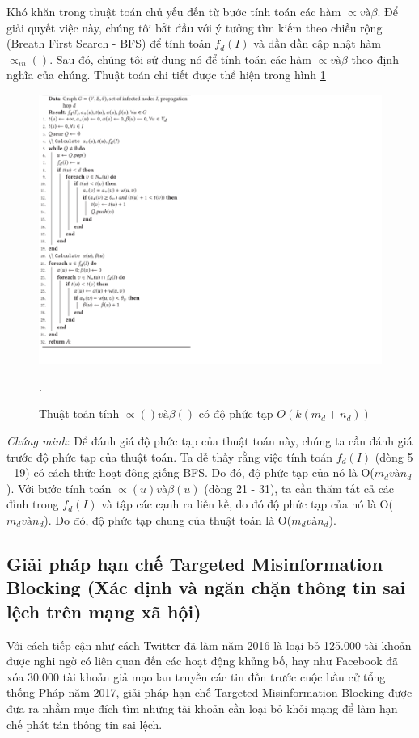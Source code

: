 		Khó khăn trong thuật toán chủ yếu đến từ bước tính toán các hàm $\propto và \beta$. Để giải quyết việc này, chúng tôi bắt đầu với ý tưởng tìm kiếm theo chiều rộng (Breath First Search - BFS) để tính toán $f_{d}(I)$ và dần dần cập nhật hàm $\propto_{in}()$. Sau đó, chúng tôi sử dụng nó để tính toán các hàm  $\propto và \beta$ theo định nghĩa của chúng. Thuật toán chi tiết được thể hiện trong hình \ref{refthuattoan2}
		\begin{center}
			\begin{figure}[htp]
				\begin{center}
					\includegraphics [scale=.5]{picture/thuattoan2}
				\end{center}
				\caption{Thuật toán tính $\propto() và \beta()$ có độ phức tạp $O(k(m_{d} + n_{d}))$}.
				\label{refthuattoan2}
			\end{figure}
		\end{center}
	
		{\itshape Chứng minh}: Để đánh giá độ phức tạp của thuật toán này, chúng ta cần đánh giá trước độ phức tạp của thuật toán. Ta dễ thấy rằng việc tính  toán $f_{d}(I)$ (dòng 5 - 19) có cách thức hoạt đông giống BFS. Do đó, độ phức tạp của nó là O($m_{d} và n_{d}$). Với bước tính toán $\propto(u) và \beta(u)$ (dòng 21 - 31), ta cần thăm tất cả các đỉnh trong $f_{d}(I)$ và tập các cạnh ra liền kề, do đó độ phức tạp của nó là O($m_{d} và n_{d}$). Do đó, độ phức tạp chung của thuật toán là O($m_{d} và n_{d}$). 
	\subsection{Giải pháp hạn chế Targeted Misinformation Blocking (Xác định và ngăn chặn thông tin sai lệch trên mạng xã hội)}
	Với cách tiếp cận như cách Twitter đã làm năm 2016 là loại bỏ 125.000 tài khoản được nghi ngờ có liên quan đến các hoạt động khủng bố, hay như Facebook đã xóa 30.000 tài khoản giả mạo lan truyền các tin đồn trước cuộc bầu cử tổng thống Pháp năm 2017, giải pháp hạn chế Targeted Misinformation Blocking được đưa ra nhằm mục đích tìm những tài khoản cần loại bỏ khỏi mạng để làm hạn chế phát tán thông tin sai lệch.
	
